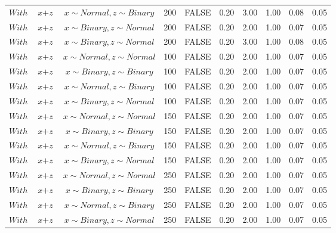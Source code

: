 \begin{longtable}{lccccccccc}
  $With$ & $\textit{x} + \textit{z}$ & $\textit{x} \sim Normal, \textit{z} \sim Binary$ & 200 & FALSE & 0.20 & 3.00 & 1.00 & 0.08 & 0.05 \\ 
  $With$ & $\textit{x} + \textit{z}$ & $\textit{x} \sim Binary, \textit{z} \sim Normal$ & 200 & FALSE & 0.20 & 2.00 & 1.00 & 0.07 & 0.05 \\ 
  $With$ & $\textit{x} + \textit{z}$ & $\textit{x} \sim Binary, \textit{z} \sim Normal$ & 200 & FALSE & 0.20 & 3.00 & 1.00 & 0.08 & 0.05 \\ 
  $With$ & $\textit{x} + \textit{z}$ & $\textit{x} \sim Normal , \textit{z} \sim Normal$ & 100 & FALSE & 0.20 & 2.00 & 1.00 & 0.07 & 0.05 \\ 
  $With$ & $\textit{x} + \textit{z}$ & $\textit{x} \sim Binary, \textit{z} \sim Binary$ & 100 & FALSE & 0.20 & 2.00 & 1.00 & 0.07 & 0.05 \\ 
  $With$ & $\textit{x} + \textit{z}$ & $\textit{x} \sim Normal, \textit{z} \sim Binary$ & 100 & FALSE & 0.20 & 2.00 & 1.00 & 0.07 & 0.05 \\ 
  $With$ & $\textit{x} + \textit{z}$ & $\textit{x} \sim Binary, \textit{z} \sim Normal$ & 100 & FALSE & 0.20 & 2.00 & 1.00 & 0.07 & 0.05 \\ 
  $With$ & $\textit{x} + \textit{z}$ & $\textit{x} \sim Normal , \textit{z} \sim Normal$ & 150 & FALSE & 0.20 & 2.00 & 1.00 & 0.07 & 0.05 \\ 
  $With$ & $\textit{x} + \textit{z}$ & $\textit{x} \sim Binary, \textit{z} \sim Binary$ & 150 & FALSE & 0.20 & 2.00 & 1.00 & 0.07 & 0.05 \\ 
  $With$ & $\textit{x} + \textit{z}$ & $\textit{x} \sim Normal, \textit{z} \sim Binary$ & 150 & FALSE & 0.20 & 2.00 & 1.00 & 0.07 & 0.05 \\ 
  $With$ & $\textit{x} + \textit{z}$ & $\textit{x} \sim Binary, \textit{z} \sim Normal$ & 150 & FALSE & 0.20 & 2.00 & 1.00 & 0.07 & 0.05 \\ 
  $With$ & $\textit{x} + \textit{z}$ & $\textit{x} \sim Normal , \textit{z} \sim Normal$ & 250 & FALSE & 0.20 & 2.00 & 1.00 & 0.07 & 0.05 \\ 
  $With$ & $\textit{x} + \textit{z}$ & $\textit{x} \sim Binary, \textit{z} \sim Binary$ & 250 & FALSE & 0.20 & 2.00 & 1.00 & 0.07 & 0.05 \\ 
  $With$ & $\textit{x} + \textit{z}$ & $\textit{x} \sim Normal, \textit{z} \sim Binary$ & 250 & FALSE & 0.20 & 2.00 & 1.00 & 0.07 & 0.05 \\ 
  $With$ & $\textit{x} + \textit{z}$ & $\textit{x} \sim Binary, \textit{z} \sim Normal$ & 250 & FALSE & 0.20 & 2.00 & 1.00 & 0.07 & 0.05 \\ 

\end{longtable}
